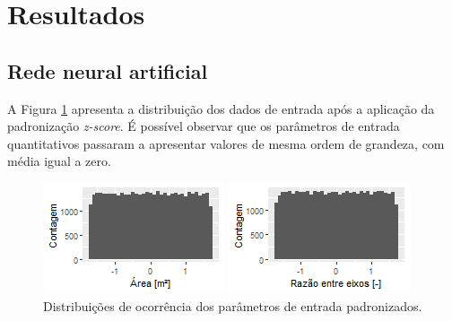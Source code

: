 \documentclass{article}
\begin{document}
\section{Resultados} %

\subsection{Rede neural artificial}

A Figura \ref{fig:db_histszscore} apresenta a distribuição dos dados de entrada após a aplicação da padronização \textit{z-score}. É possível observar que os parâmetros de entrada quantitativos passaram a apresentar valores de mesma ordem de grandeza, com média igual a zero. 

\begin{figure}[h!]
	\caption{Distribuições de ocorrência dos parâmetros de entrada padronizados.} %
	\label{fig:db_histszscore}
	\centering
	\begin{minipage}{.33\textwidth}
		\centering
		\includegraphics[width=\linewidth]{zscore_plot_area.png}
	\end{minipage}%
	\begin{minipage}{.33\textwidth}
		\centering
		\includegraphics[width=\linewidth]{zscore_plot_ratio.png}

\end{minipage}
\end{figure}
\end{document}
